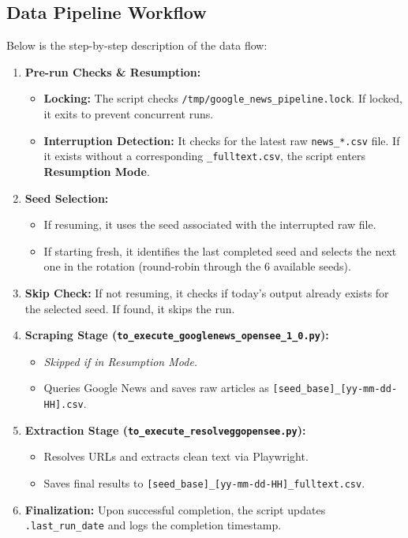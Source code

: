 \documentclass[11pt,a4paper]{article}
\begin{document}
\subsection{Data Pipeline Workflow}
Below is the step-by-step description of the data flow:
\begin{enumerate}
    \item \textbf{Pre-run Checks \& Resumption:}
    \begin{itemize}
        \item \textbf{Locking:} The script checks \verb|/tmp/google_news_pipeline.lock|. If locked, it exits to prevent concurrent runs.
        \item \textbf{Interruption Detection:} It checks for the latest raw \verb|news_*.csv| file. If it exists without a corresponding \verb|_fulltext.csv|, the script enters \textbf{Resumption Mode}.
    \end{itemize}
    \item \textbf{Seed Selection:} 
    \begin{itemize}
        \item If resuming, it uses the seed associated with the interrupted raw file.
        \item If starting fresh, it identifies the last completed seed and selects the next one in the rotation (round-robin through the 6 available seeds).
    \end{itemize}
    \item \textbf{Skip Check:} If not resuming, it checks if today's output already exists for the selected seed. If found, it skips the run.
    \item \textbf{Scraping Stage (\texttt{to\_execute\_googlenews\_opensee\_1\_0.py}):}
    \begin{itemize}
        \item \textit{Skipped if in Resumption Mode.}
        \item Queries Google News and saves raw articles as \verb|[seed_base]_[yy-mm-dd-HH].csv|.
    \end{itemize}
    \item \textbf{Extraction Stage (\texttt{to\_execute\_resolveggopensee.py}):}
    \begin{itemize}
        \item Resolves URLs and extracts clean text via Playwright.
        \item Saves final results to \verb|[seed_base]_[yy-mm-dd-HH]_fulltext.csv|.
    \end{itemize}
    \item \textbf{Finalization:} Upon successful completion, the script updates \verb|.last_run_date| and logs the completion timestamp.
\end{enumerate}
\end{document}
